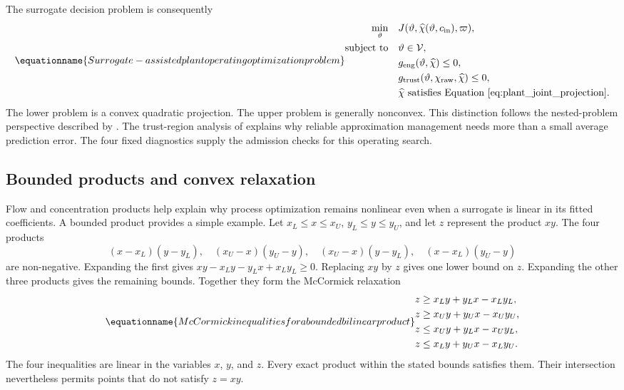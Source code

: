 The surrogate decision problem is consequently
\begin{equation}
\equationname{Surrogate-assisted plant operating optimization problem}
\begin{aligned}
\min_{\vartheta}\quad&J(\vartheta,\widehat\chi(\vartheta,c_{\rm in}),\varpi),\\
\text{subject to}\quad&\vartheta\in\mathcal V,\\
&g_{\rm eng}(\vartheta,\widehat\chi)\le0,\\
&g_{\rm trust}(\vartheta,\chi_{\rm raw},\widehat\chi)\le0,\\
&\widehat\chi\text{ satisfies Equation~\eqref{eq:plant_joint_projection}}.
\end{aligned}
\label{eq:plant_surrogate_optimization}
\end{equation}
The lower problem is a convex quadratic projection. The upper problem is generally nonconvex. This distinction follows the nested-problem perspective described by \citet{Colson2007}. The trust-region analysis of \citet{Alexandrov1998} explains why reliable approximation management needs more than a small average prediction error. The four fixed diagnostics supply the admission checks for this operating search.


\subsection{Bounded products and convex relaxation}

Flow and concentration products help explain why process optimization remains nonlinear even when a surrogate is linear in its fitted coefficients. A bounded product provides a simple example. Let $x_L\leq x\leq x_U$, $y_L\leq y\leq y_U$, and let $z$ represent the product $xy$. The four products
\[
(x-x_L)(y-y_L),\quad (x_U-x)(y_U-y),\quad
(x_U-x)(y-y_L),\quad (x-x_L)(y_U-y)
\]
are non-negative. Expanding the first gives $xy-x_Ly-y_Lx+x_Ly_L\geq0$. Replacing $xy$ by $z$ gives one lower bound on $z$. Expanding the other three products gives the remaining bounds. Together they form the McCormick relaxation \citep{McCormick1976}
\begin{equation}
\equationname{McCormick inequalities for a bounded bilinear product}
\begin{aligned}
z&\geq x_Ly+y_Lx-x_Ly_L,\\
z&\geq x_Uy+y_Ux-x_Uy_U,\\
z&\leq x_Uy+y_Lx-x_Uy_L,\\
z&\leq x_Ly+y_Ux-x_Ly_U.
\end{aligned}
\label{eq:teaching_mccormick_relaxation}
\end{equation}
The four inequalities are linear in the variables $x$, $y$, and $z$. Every exact product within the stated bounds satisfies them. Their intersection nevertheless permits points that do not satisfy $z=xy$.

